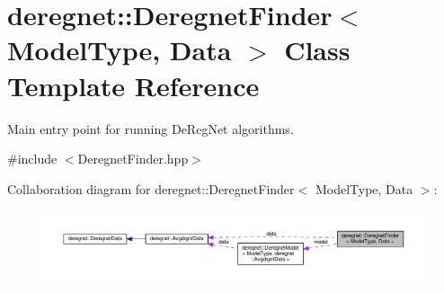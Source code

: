 \hypertarget{classderegnet_1_1DeregnetFinder}{}\section{deregnet\+:\+:Deregnet\+Finder$<$ Model\+Type, Data $>$ Class Template Reference}
\label{classderegnet_1_1DeregnetFinder}


Main entry point for running De\+Reg\+Net algorithms.  




{\ttfamily \#include $<$Deregnet\+Finder.\+hpp$>$}



Collaboration diagram for deregnet\+:\+:Deregnet\+Finder$<$ Model\+Type, Data $>$\+:\nopagebreak
\begin{figure}[H]
\begin{center}
\leavevmode
\includegraphics[width=350pt]{classderegnet_1_1DeregnetFinder__coll__graph}
\end{center}
\end{figure}
